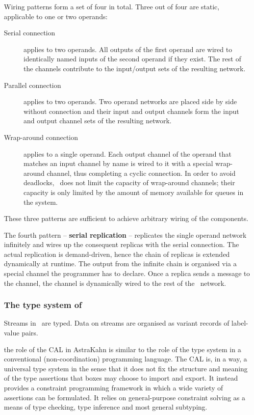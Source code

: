 Wiring patterns form a set of four in total. Three out of four are static, applicable to one or two operands:
\begin{description}
\item[Serial connection] applies to two operands. All outputs of the first operand are wired to identically named inputs of the second operand if they exist. The rest of the channels contribute to the input/output sets of the resulting network.

\item[Parallel connection] applies to two operands. Two operand networks are placed side by side without connection and their input and output channels form the input and output channel sets of the resulting network.

\item[Wrap-around connection] applies to a single operand. Each output channel of the operand that matches an input channel by name is wired to it with a special wrap-around channel, thus completing a cyclic connection. In order to avoid deadlocks, \ak\ does not limit the capacity of wrap-around channels; their capacity is only limited by the amount of memory available for queues in the system.
\end{description}
These three patterns are sufficient to achieve arbitrary wiring of the components.

The fourth pattern -- \textbf{serial replication} -- replicates the single operand network infinitely and wires up the consequent replicas with the serial connection. The actual replication is demand-driven, hence the chain of replicas is extended dynamically at runtime. The output from the infinite chain is organised via a special channel the programmer has to declare. Once a replica sends a message to the channel, the channel is dynamically wired to the rest of the \ak\ network.


    \subsubsection{The type system of \ak\ }

Streams in \ak\ are typed. Data on streams are organised as variant records of label-value pairs. 


the role of the CAL in AstraKahn is similar to the role
of the type system in a conventional (non-coordination) programming language. The CAL is, in a way, a universal type system in the sense that it does not fix the structure and meaning of the type assertions that boxes may choose to import and export. It instead provides a constraint programming framework in which a wide variety of assertions can be formulated. It relies on general-purpose constraint solving as a means of type checking, type inference and most general subtyping.

